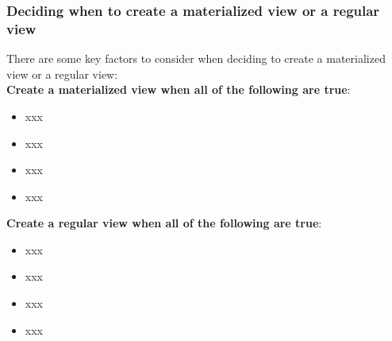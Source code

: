  
\subsubsection{Deciding when to create a materialized view or a regular view}
There are some key factors to consider when deciding to create a materialized view or a regular view:\\
\textbf{Create a materialized view when all of the following are true}:
\begin{itemize}
    \item xxx
    \item xxx
    \item xxx
    \item xxx
\end{itemize}

\textbf{Create a regular view when all of the following are true}:
\begin{itemize}
    \item xxx
    \item xxx
    \item xxx
    \item xxx
\end{itemize}
